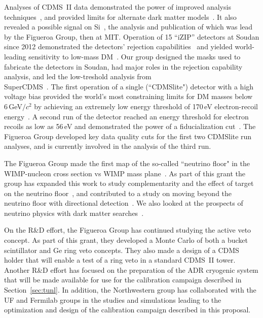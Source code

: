 Analyses of CDMS~II data demonstrated the power of improved analysis techniques~\cite{Agnese:2014xye,Agnese:2015ywx}, and provided limits for alternate dark matter models~\cite{Agnese:2014vxh}. It also revealed a possible signal on Si~\cite{Agnese:13prl}, the analysis and publication of which was lead by the Figueroa Group, then at MIT. 
Operation of 15 \SuperCDMS ``iZIP'' detectors at Soudan since 2012 demonstrated the detectors' rejection capabilities~\cite{Agnese:13apl} and yielded world-leading sensitivity to low-mass 
DM~\cite{Agnese:13prl2,Agnese:2014aze,Agnese:2015nto}.  Our group designed the masks used to fabricate the detectors in \SuperCDMS Soudan, had major roles in the rejection capability analysis, and led the low-treshold analysis \cite{Agnese:2014aze} from \\SuperCDMS\ \Soudan.
The first operation of a single (``CDMSlite") detector with a high voltage bias provided the world's most constraining limits for DM masses below 6\,GeV$/c^2$ by achieving an extremely low energy threshold of 170\,eV electron-recoil energy~\cite{Agnese:13prl2}. A second run of the detector reached an energy threshold for electron recoils as low as 56\,eV and demonstrated the power of a fiducialization cut~\cite{Agnese:2015nto}. The Figueroa Group developed key data quality cuts for the first two CDMSlite run analyses, and is currently involved in the analysis of the third run.
 
The Figueroa Group made the first map of the so-called ``neutrino floor" in the WIMP-nucleon cross section vs WIMP mass plane~\cite{Billard:14prd}. As part of this grant the group has expanded this work to study complementarity and the effect of target on the neutrino floor~\cite{Ruppin:2014bra}, and contributed to a study on moving beyond the neutrino floor with directional detection~\cite{OHare2015Readout-strateg}. We also looked at the prospects of neutrino physics with dark matter searches~\cite{2015PhRvD..91i5023B}.
 
On the R\&D effort, the Figueroa Group has continued studying the active veto concept. As part of this grant, they developed a \geant Monte Carlo of both a bucket scintillator and Ge ring veto concepts.  They also made a design of a CDMS holder that will enable a test of a ring veto in a standard CDMS~II tower. Another R\&D effort has focused on the preparation of the ADR cryogenic system that will be made available for use for the \tunl calibration campaign described in Section~\ref{sec:tunl}. In addition, the Northwestern group has collaborated with the UF and Fermilab groups in the studies and simulations leading to the optimization and design of the calibration campaign described in this proposal.

